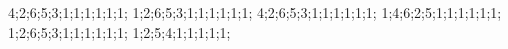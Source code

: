 4;2;6;5;3;1;1;1;1;1;1;
1;2;6;5;3;1;1;1;1;1;1;
4;2;6;5;3;1;1;1;1;1;1;
1;4;6;2;5;1;1;1;1;1;1;
1;2;6;5;3;1;1;1;1;1;1;
1;2;5;4;1;1;1;1;1;
